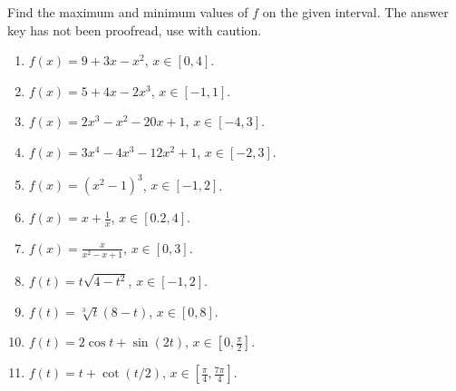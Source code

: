 Find the maximum and minimum values of $f$ on the given interval. The answer key has not been proofread, use with caution.
\begin{multicols}{2}
\begin{enumerate}[ref={\fcProblemRef}]
\item $\displaystyle f(x)=9+3x-x^2$, $x\in [0,4]$.

\item $\displaystyle f(x)=5+4x-2x^3$, $x\in[-1,1] $.

\item $\displaystyle f(x)=2x^3-x^2-20x+1$, $x\in [-4,3]$.

\item $\displaystyle f(x)=3x^4-4x^3-12x^2+1$, $x\in [-2, 3]$.

\item $\displaystyle f(x)=(x^2-1)^3$, $x\in [-1, 2]$.

\item $\displaystyle f(x)=x+\frac{1}{x}$, $x\in [0.2,4 ]$.

\item $\displaystyle f(x)=\frac{x}{x^2-x+1}$, $x\in [0,3 ]$.

\item $\displaystyle f(t)=t\sqrt{4-t^2}$, $x\in [-1,2 ]$.

\item $\displaystyle f(t)=\sqrt[3]{t}(8-t) $, $x\in [0,8 ]$.

\item $\displaystyle f(t)=2\cos t+\sin (2t)$, $x\in [0,\frac{\pi}{2} ]$.

\item $\displaystyle f(t)=t+\cot (t/2) $, $x\in [\frac{\pi}{4},\frac{7\pi}{4} ]$.
\end{enumerate}
\end{multicols}
